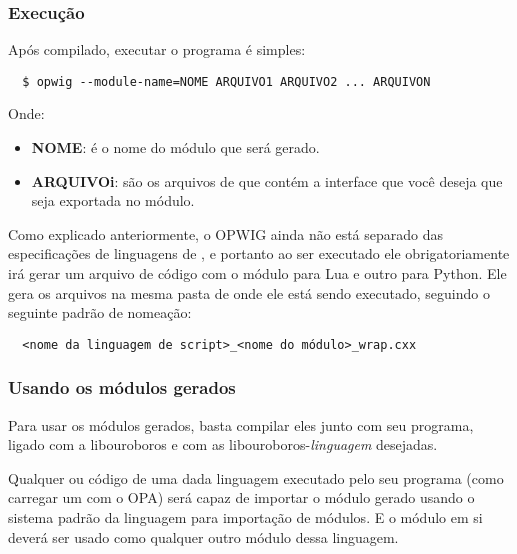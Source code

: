 \subsubsection{Execução}
Após compilado, executar o programa é simples:
\begin{verbatim}
  $ opwig --module-name=NOME ARQUIVO1 ARQUIVO2 ... ARQUIVON
\end{verbatim}
Onde:
\begin{itemize}
  \item \textbf{NOME}: é o nome do módulo que será gerado.
  \item \textbf{ARQUIVOi}: são os arquivos de \CXX{} que contém a interface
    que você deseja que seja exportada no módulo.
\end{itemize}

Como explicado anteriormente, o OPWIG ainda não está separado das especificações
de linguagens de \script{}, e portanto ao ser executado ele obrigatoriamente
irá gerar um arquivo de código com o módulo para Lua e outro para Python. Ele gera
os arquivos na mesma pasta de onde ele está sendo executado, seguindo o seguinte
padrão de nomeação:
\begin{verbatim}
  <nome da linguagem de script>_<nome do módulo>_wrap.cxx
\end{verbatim}

\subsubsection{Usando os módulos gerados}
Para usar os módulos gerados, basta compilar eles junto com seu programa, ligado com
a libouroboros e com as libouroboros-\textit{linguagem} desejadas.

Qualquer \script{} ou código de uma dada linguagem executado pelo seu programa (como 
carregar um \script{} com o OPA) será capaz de importar o módulo gerado usando o
sistema padrão da linguagem para importação de módulos. E o módulo em si deverá ser
usado como qualquer outro módulo dessa linguagem.
